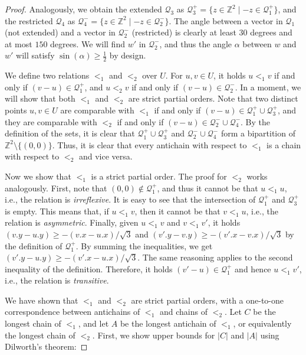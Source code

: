 \documentclass[a4paper,11pt]{article}
\newcommand{\Q}{\mathcal{Q}}
\newcommand{\absolute}[1]{\left\lvert#1\right\rvert}
\begin{document}
\begin{proof}
%

%
Analogously, we obtain the extended $\Q_3$ as $\Q_3^+ = \{ z \in \mathbb Z^2 \mid -z \in \Q_1^+ \}$, and the restricted $\Q_4$ as $\Q_4^- = \{ z \in \mathbb Z^2 \mid -z \in \Q_2^- \}$. The angle between a vector in $\Q_1$ (not extended) and a vector in $\Q_2^-$ (restricted) is clearly at least $30$ degrees and at most $150$ degrees. We will find $w'$ in $\Q_2^-$, and thus the angle $\alpha$ between $w$ and $w'$ will satisfy $\sin(\alpha) \geq \frac12$ by design.

We define two relations $<_1$ and $<_2$ over $U$. For $u, v \in U$, it holds $u <_1 v$ if and only if $(v - u) \in \Q_1^+$, and $u <_2 v$ if and only if $(v - u) \in \Q_2^-$. In a moment, we will show that both $<_1$ and $<_2$ are strict partial orders. 
Note that two distinct points $u,v \in U$ are comparable with $<_1$ if and only if $(v - u) \in \Q_1^+ \cup \Q_3^+$, and they are comparable with $<_2$ if and only if $(v - u) \in \Q_2^- \cup \Q_4^-$. 
By the definition of the sets, it is clear that $\Q_1^+ \cup \Q_3^+$ and $\Q_2^- \cup \Q_4^-$ form a bipartition of $\mathbb Z^2 \setminus \{(0,0)\}$.
Thus, it is clear that every antichain with respect to $<_1$ is a chain with respect to $<_2$ and vice versa.

Now we show that $<_1$ is a strict partial order. The proof for $<_2$ works analogously. First, note that $(0,0) \notin \Q_1^+$, and thus it cannot be that $u <_1 u$, i.e., the relation is \emph{irreflexive}. It is easy to see that the intersection of $\Q_1^+$ and $\Q_3^+$ is empty. This means that, if $u <_1 v$, then it cannot be that $v <_1 u$, i.e., the relation is \emph{asymmetric}. Finally, given $u <_1 v$ and $v <_1 v'$, it holds $(v.y - u.y) \geq -(v.x-u.x)/\sqrt{3}$ and $(v'.y - v.y) \geq -(v'.x-v.x)/\sqrt{3}$ by the definition of $\Q_1^+$. By summing the inequalities, we get $(v'.y - u.y) \geq -(v'.x-u.x)/\sqrt{3}$. The same reasoning applies to the second inequality of the definition. Therefore, it holds $(v' - u) \in \Q_1^+$ and hence $u <_1 v'$, i.e., the relation is \emph{transitive}.

We have shown that $<_1$ and $<_2$ are strict partial orders, with a one-to-one correspondence between antichains of $<_1$ and chains of $<_2$.
Let $C$ be the longest chain of $<_1$, and let $A$ be the longest antichain of $<_1$, or equivalently the longest chain of $<_2$. First, we show upper bounds for $\absolute{C}$ and $\absolute{A}$ using Dilworth's theorem:


\end{proof}
\end{document}
